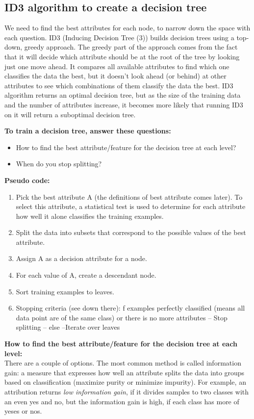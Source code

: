 \documentclass[12pt]{report}
\begin{document}
\subsection{ID3 algorithm to create a decision tree}
We need to find the best attributes for each node, to narrow down the space with each question.
ID3 (Inducing Decision Tree (3)) builds decision trees using a top-down, greedy approach. The greedy part of the approach comes from the fact that it will decide which attribute should be at the root of the tree by looking just one move ahead. It compares all available attributes to find which one classifies the data the best, but it doesn't look ahead (or behind) at other attributes to see which combinations of them classify the data the best. ID3 algorithm returns an optimal decision tree, but as the size of the training data and the number of attributes increase, it becomes more likely that running ID3 on it will return a suboptimal decision tree.

\hfill \break
\textbf{To train a decision tree, answer these questions:}
\begin{itemize}
	\item How to find the best attribute/feature for the decision tree at each level?
	\item When do you stop splitting?
\end{itemize}

\hfill \break
\textbf{Pseudo code:}
\begin{enumerate}
\item Pick the best attribute A (the definitions of best attribute comes later). To select this attribute, a statistical test is used to determine for each attribute how well it alone classifies the training examples.
\item Split the data into subsets that correspond to the possible values of the best attribute.
\item Assign A as a decision attribute for a node.
\item For each value of A, create a descendant node.
\item Sort training examples to leaves.
\item Stopping criteria (see down there): f examples perfectly classified (means all data point are of the same class) or there is no more attributes --	Stop splitting -- else --Iterate over leaves
\end{enumerate}

\hfill \break
\textbf{How to find the best attribute/feature for the decision tree at each level:} \\
There are a couple of options. The most common method is called information gain: a measure that expresses how well an attribute splits the data into groups based on classification (maximize purity or minimize impurity). For example, an attribution returns \textit{low information gain}, if it divides samples to two classes with an even yes and no, but the information gain is high, if each class has more of yeses or nos.
\end{document}

